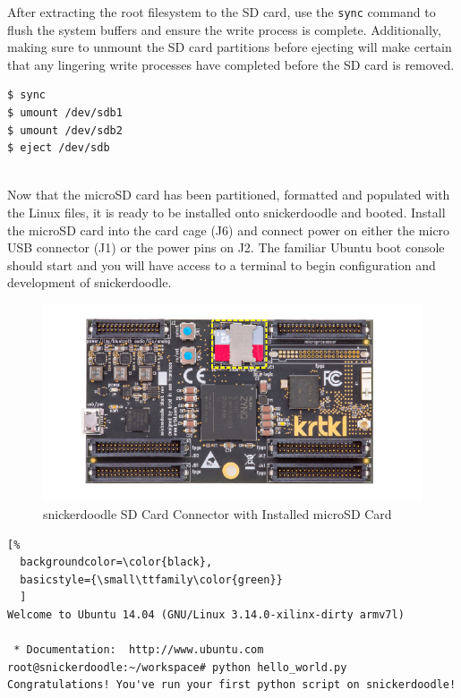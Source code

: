 After extracting the root filesystem to the SD card, use the \texttt{sync} command to flush the system buffers and ensure the write process is complete. Additionally, making sure to unmount the SD card partitions before ejecting will make certain that any lingering write processes have completed before the SD card is removed.


\begin{lstlisting}
$ sync
$ umount /dev/sdb1
$ umount /dev/sdb2
$ eject /dev/sdb
\end{lstlisting}


~\\
\noindent
Now that the microSD card has been partitioned, formatted and populated with the Linux files, it is ready to be installed onto snickerdoodle and booted. Install the microSD card into the card cage (J6) and connect power on either the micro USB connector (J1) or the power pins on J2. The familiar Ubuntu boot console should start and you will have access to a terminal to begin configuration and development of snickerdoodle. 

\begin{figure}
	\centering
	\includegraphics{images/SD_microSD.pdf}
	\caption{snickerdoodle SD Card Connector with Installed microSD Card}
\end{figure}


\begin{fullwidth}
\begin{lstlisting}[%
  backgroundcolor=\color{black},
  basicstyle={\small\ttfamily\color{green}}
  ]
Welcome to Ubuntu 14.04 (GNU/Linux 3.14.0-xilinx-dirty armv7l)

 * Documentation:  http://www.ubuntu.com
root@snickerdoodle:~/workspace# python hello_world.py 
Congratulations! You've run your first python script on snickerdoodle!
\end{lstlisting}
\end{fullwidth}

